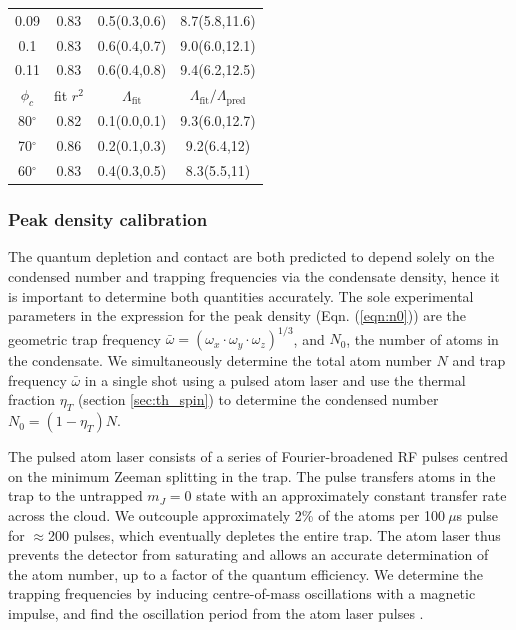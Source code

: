 \begin{table}
\begin{minipage}[t]{0.5\textwidth}
\begin{tabular}{c c c c}
			0.09    &   0.83   &   0.5(0.3,0.6)  &  8.7(5.8,11.6)\\
			0.1     &   0.83   &   0.6(0.4,0.7)  &  9.0(6.0,12.1)\\
			0.11    &   0.83   &   0.6(0.4,0.8)  &  9.4(6.2,12.5)\\
			\hline
			$\phi_c$ & fit $r^2$ &  $\Lambda_\textrm{fit}$ & $\Lambda_\textrm{fit}/\Lambda_\textrm{pred}$\\
			\hline
			80$^\circ$    &   0.82   &   0.1(0.0,0.1) &  9.3(6.0,12.7)\\
			70$^\circ$    &   0.86   &   0.2(0.1,0.3) &  9.2(6.4,12)\\
			60$^\circ$    &   0.83   &   0.4(0.3,0.5) &  8.3(5.5,11)\\
			\hline\hline
		\end{tabular}
  \end{minipage}
\end{table}


\subsubsection{Peak density calibration}

    The quantum depletion and contact are both predicted to depend solely on the condensed number and trapping frequencies via the condensate density, hence it is important to determine both quantities accurately. 
    The sole experimental parameters in the expression for the peak density (Eqn. (\ref{eqn:n0})) are the geometric trap frequency $\bar{\omega} = \left(\omega_x\cdot\omega_y\cdot\omega_z\right)^{1/3}$, and $N_0$, the number of atoms in the condensate. 
    We simultaneously determine the total atom number $N$ and trap frequency $\bar{\omega}$ in a single shot using a pulsed atom laser and use the thermal fraction $\eta_T$ (section \ref{sec:th_spin}) to determine the condensed number $N_0 = (1-\eta_T)N$. 

	The pulsed atom laser consists of a series of Fourier-broadened RF pulses centred on the minimum Zeeman splitting in the trap. 
	The pulse transfers atoms in the trap to the untrapped $m_J=0$ state with an approximately constant transfer rate across the cloud. 
	We outcouple approximately 2\% of the atoms per 100$~\mu$s pulse for $\approx$200 pulses, which eventually depletes the entire trap. 
	The atom laser thus prevents the detector from saturating and allows an accurate determination of the atom number, up to a factor of the quantum efficiency. 
	We determine the trapping frequencies by inducing centre-of-mass oscillations with a magnetic impulse, and find the oscillation period from the atom laser pulses \cite{henson18ML}.


